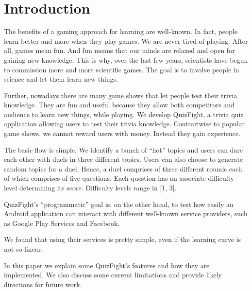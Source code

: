 \section{Introduction}
The benefits of a gaming approach for learning are well-known. In fact,
people learn better and more when they play games. We are never tired of
playing.
After all, games mean fun. And fun means that our minds are relaxed and open
for gaining new knowledge.
This is why, over the last few years, scientists have begun to commission
more and more scientific games.
The goal is to involve people in science and let them learn new things.

Further, nowadays there are many game shows that let people test their trivia
knowledge.
They are fun and useful because they allow both competitors and audience to
learn new things, while playing.
We develop QuizFight, a trivia quiz application allowing users to test their
trivia knowledge.
Contrariwise to popular game shows, we cannot reward users with money.
Instead they gain experience. 

The basic flow is simple. We identify a bunch of ``hot'' topics and users can
dare each other with duels in three different topics.
Users can also choose to generate random topics for a duel.
Hence, a duel comprises of three different rounds each of which comprises
of five questions.
Each question has an associate difficulty level determining its score.
Difficulty levels range in [1, 3].

QuizFight's ``programmatic'' goal is, on the other hand, to test how easily an
Android application can interact with different well-known service providers,
such as Google Play Services and Facebook.

We found that using their services is pretty simple, even if the learning curve
is not so linear.

In this paper we explain some QuizFight's features and how they are
implemented.
We also discuss some current limitations and provide likely directions for
future work. 


